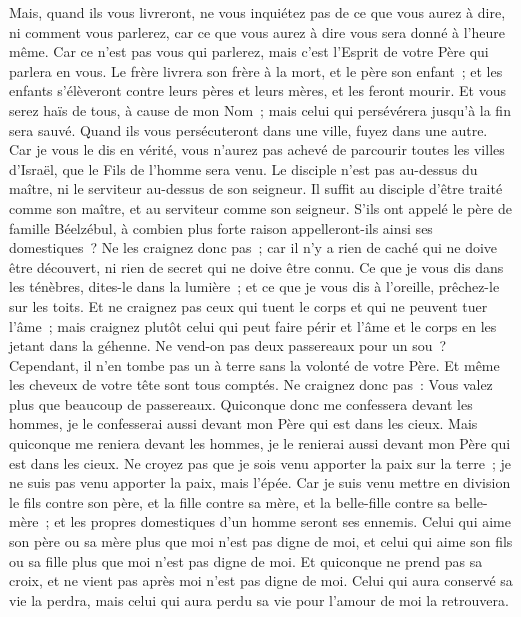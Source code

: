 \begin{multicols}{2}
Mais, quand ils vous livreront, ne vous inquiétez pas de ce que vous aurez à dire, ni comment vous parlerez, car ce que vous aurez à dire vous sera donné à l'heure même.
Car ce n'est pas vous qui parlerez, mais c'est l'Esprit de votre Père qui parlera en vous.
Le frère livrera son frère à la mort, et le père son enfant~; et les enfants s'élèveront contre leurs pères et leurs mères, et les feront mourir.
Et vous serez haïs de tous, à cause de mon Nom~; mais celui qui persévérera jusqu'à la fin sera sauvé.
Quand ils vous persécuteront dans une ville, fuyez dans une autre. Car je vous le dis en vérité, vous n'aurez pas achevé de parcourir toutes les villes d'Israël, que le Fils de l'homme sera venu.
Le disciple n'est pas au-dessus du maître, ni le serviteur au-dessus de son seigneur.
Il suffit au disciple d'être traité comme son maître, et au serviteur comme son seigneur. S'ils ont appelé le père de famille Béelzébul, à combien plus forte raison appelleront-ils ainsi ses domestiques~?
Ne les craignez donc pas~; car il n'y a rien de caché qui ne doive être découvert, ni rien de secret qui ne doive être connu.
Ce que je vous dis dans les ténèbres, dites-le dans la lumière~; et ce que je vous dis à l'oreille, prêchez-le sur les toits.
Et ne craignez pas ceux qui tuent le corps et qui ne peuvent tuer l'âme~; mais craignez plutôt celui qui peut faire périr et l'âme et le corps en les jetant dans la géhenne.
Ne vend-on pas deux passereaux pour un sou~? Cependant, il n'en tombe pas un à terre sans la volonté de votre Père.
Et même les cheveux de votre tête sont tous comptés.
Ne craignez donc pas~: Vous valez plus que beaucoup de passereaux.
Quiconque donc me confessera devant les hommes, je le confesserai aussi devant mon Père qui est dans les cieux.
Mais quiconque me reniera devant les hommes, je le renierai aussi devant mon Père qui est dans les cieux.
Ne croyez pas que je sois venu apporter la paix sur la terre~; je ne suis pas venu apporter la paix, mais l'épée.
Car je suis venu mettre en division le fils contre son père, et la fille contre sa mère, et la belle-fille contre sa belle-mère~;
et les propres domestiques d'un homme seront ses ennemis.
Celui qui aime son père ou sa mère plus que moi n'est pas digne de moi, et celui qui aime son fils ou sa fille plus que moi n'est pas digne de moi.
Et quiconque ne prend pas sa croix, et ne vient pas après moi n'est pas digne de moi.
Celui qui aura conservé sa vie la perdra, mais celui qui aura perdu sa vie pour l'amour de moi la retrouvera.

\end{multicols}
